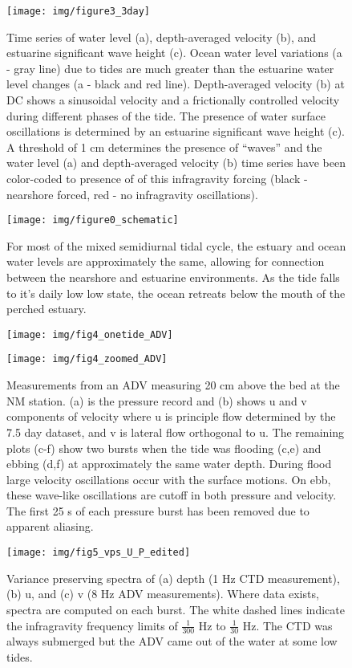 \begin{figure}
\texttt{[image: img/figure3\_3day]}

\protect\caption{Time series of water level (a), depth-averaged velocity (b), and estuarine
significant wave height (c). Ocean water level variations (a - gray
line) due to tides are much greater than the estuarine water level
changes (a - black and red line). Depth-averaged velocity (b) at DC
shows a sinusoidal velocity and a frictionally controlled velocity
during different phases of the tide. The presence of water surface
oscillations is determined by an estuarine significant wave height
(c). A threshold of 1 cm determines the presence of ``waves'' and
the water level (a) and depth-averaged velocity (b) time series have
been color-coded to presence of of this infragravity forcing (black
- nearshore forced, red - no infragravity oscillations). \label{f3_HUHse}}
\end{figure}


\begin{figure}
\texttt{[image: img/figure0\_schematic]}

\protect\caption{For most of the mixed semidiurnal tidal cycle, the estuary and ocean
water levels are approximately the same, allowing for connection between
the nearshore and estuarine environments. As the tide falls to it's
daily low low state, the ocean retreats below the mouth of the perched
estuary.\label{f4_wl_schematic}}
\end{figure}


\begin{figure}
\texttt{[image: img/fig4\_onetide\_ADV]}

\texttt{[image: img/fig4\_zoomed\_ADV]}\protect\caption{Measurements from an ADV measuring 20 cm above the bed at the NM station.
(a) is the pressure record and (b) shows u and v components of velocity
where u is principle flow determined by the 7.5 day dataset, and v
is lateral flow orthogonal to u. The remaining plots (c-f) show two
bursts when the tide was flooding (c,e) and ebbing (d,f) at approximately
the same water depth. During flood large velocity oscillations occur
with the surface motions. On ebb, these wave-like oscillations are
cutoff in both pressure and velocity. The first 25 s of each pressure
burst has been removed due to apparent aliasing. \label{f5_adv}}
\end{figure}


\begin{figure}
\texttt{[image: img/fig5\_vps\_U\_P\_edited]}

\protect\caption{Variance preserving spectra of (a) depth (1 Hz CTD measurement), (b)
u, and (c) v (8 Hz ADV measurements). Where data exists, spectra are
computed on each burst. The white dashed lines indicate the infragravity
frequency limits of $\frac{1}{300}$ Hz to $\frac{1}{30}$ Hz. The
CTD was always submerged but the ADV came out of the water at some
low tides. \label{f6_spectra}}
\end{figure}


